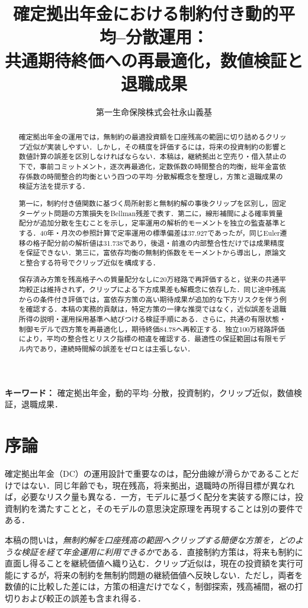 \documentclass[10pt,a4paper]{article}
\title{確定拠出年金における制約付き動的平均--分散運用：\\\large 共通期待終価への再最適化，数値検証と退職成果}
\author{第一生命保険株式会社\quad 永山義基}
\date{}
\numberwithin{equation}{section}
\numberwithin{table}{section}
\numberwithin{figure}{section}
\theoremstyle{plain}
\theoremstyle{definition}
\begin{document}
\maketitle
\begin{abstract}
確定拠出年金の運用では，無制約の最適投資額を口座残高の範囲に切り詰めるクリップ近似が実装しやすい．しかし，その精度を評価するには，将来の投資制約の影響と数値計算の誤差を区別しなければならない．本稿は，継続拠出と空売り・借入禁止の下で，事前コミットメント，逐次再最適化，定数係数の時間整合的均衡，総年金富依存係数の時間整合的均衡という四つの平均--分散解概念を整理し，方策と退職成果の検証方法を提示する．

第一に，制約付き値関数に基づく局所射影と無制約解の事後クリップを区別し，固定ターゲット問題の方策損失をBellman残差で表す．第二に，線形補間による確率質量配分が追加分散を生むことを示し，定率運用の解析的モーメントを独立の監査基準とする．40年・月次の参照計算で定率運用の標準偏差は37.927であったが，同じEuler遷移の格子配分前の解析値は31.738であり，後退・前進の内部整合性だけでは成果精度を保証できない．第三に，富依存均衡の無制約係数をモーメントから導出し，原論文と整合する符号でクリップ近似を構成する．

保存済み方策を残高格子への質量配分なしに20万経路で再評価すると，従来の共通平均較正は維持されず，クリップによる下方成果差も解概念に依存した．同じ途中残高からの条件付き評価では，富依存方策の高い期待成果が追加的な下方リスクを伴う例を確認する．本稿の実務的貢献は，特定方策の一律な推奨ではなく，近似誤差を退職所得の説明・運用採用基準へ結びつける検証手順にある．さらに，共通の有限状態・制御モデルで四方策を再最適化し，期待終価84.78へ再較正する．独立100万経路評価により，平均の整合性とリスク指標の相違を確認する．最適性の保証範囲は有限モデル内であり，連続時間解の誤差をゼロとは主張しない．
\end{abstract}
\noindent\textbf{キーワード：} 確定拠出年金，動的平均--分散，投資制約，クリップ近似，数値検証，退職成果．

\section{序論}
\label{sec:introduction}
確定拠出年金（DC）の運用設計で重要なのは，配分曲線が滑らかであることだけではない．同じ年齢でも，現在残高，将来拠出，退職時の所得目標が異なれば，必要なリスク量も異なる．一方，モデルに基づく配分を実装する際には，投資制約を満たすことと，そのモデルの意思決定原理を再現することは別の要件である．

本稿の問いは，\emph{無制約解を口座残高の範囲へクリップする簡便な方策を，どのような検証を経て年金運用に利用できるか}である．直接制約方策は，将来も制約に直面し得ることを継続価値へ織り込む．クリップ近似は，現在の投資額を実行可能にするが，将来の制約を無制約問題の継続価値へ反映しない．ただし，両者を数値的に比較した差には，方策の相違だけでなく，制御探索，残高補間，裾の打切りおよび較正の誤差も含まれ得る．
\end{document}
